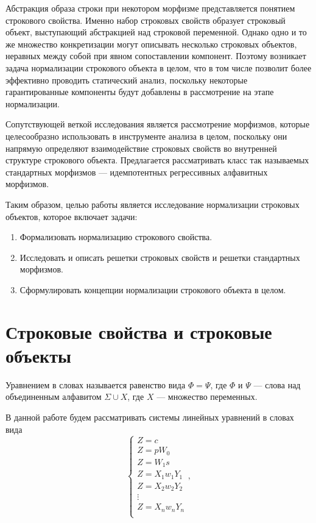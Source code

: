 \documentclass[fontsize=14pt]{scrartcl}
\begin{document}
Абстракция образа строки при некотором морфизме представляется понятием строкового свойства. Именно 
набор строковых свойств образует строковый объект, выступающий абстракцией над строковой переменной.
Однако одно и то же множество конкретизации могут описывать несколько строковых объектов, неравных между собой
при явном сопоставлении компонент. Поэтому возникает задача нормализации строкового объекта в целом,
что в том числе позволит более эффективно проводить статический анализ, поскольку некоторые гарантированные
компоненты будут добавлены в рассмотрение на этапе нормализации.

Сопутствующей веткой исследования является рассмотрение морфизмов, которые целесообразно использовать
в инструменте анализа в целом, поскольку они напрямую определяют взаимодействие строковых свойств во внутренней структуре строкового объекта.
Предлагается рассматривать класс так называемых стандартных морфизмов --- идемпотентных 
регрессивных алфавитных морфизмов.

Таким образом, целью работы является исследование нормализации строковых объектов,
которое включает задачи:

\begin{enumerate}
\item Формализовать нормализацию строкового свойства.
\item Исследовать и описать решетки строковых свойств и решетки стандартных морфизмов.
\item Сформулировать концепции нормализации строкового объекта в целом.
\end{enumerate}



\section{Строковые свойства и строковые объекты}
\label{sec:string-properties}

Уравнением в словах называется равенство вида $\Phi = \Psi$, где $\Phi$ и $\Psi$ --- слова над объединенным 
алфавитом $\Sigma \cup X$, где $X$ --- множество переменных.

В данной работе будем рассматривать системы линейных уравнений в словах вида
\begin{equation}
  \label{eq:system-of-equations}
\begin{cases}
    Z = c \\
    Z = p W_0\\
    Z = W_1 s\\
    Z = X_1 w_1 Y_1 \\
    Z = X_2 w_2 Y_2 \\
    \vdots \\
    Z = X_n w_n Y_n \\
\end{cases},
\end{equation}
\end{document}
